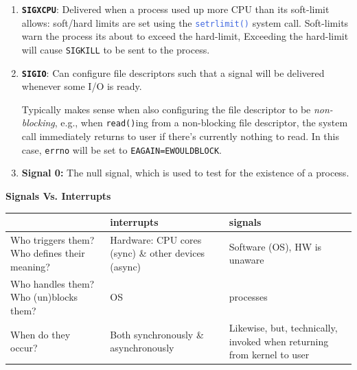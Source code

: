 \documentclass[openany,12pt]{book}
\newcommand{\code}[1]{\texttt{#1}}
\newcommand{\blue}[1]{\textcolor{RoyalBlue}{#1}}
\begin{document}
\begin{enumerate}
  \item \textbf{\code{SIGXCPU}}: Delivered when a process used up more CPU than its soft-limit allows: soft/hard limits are set using the \blue{\code{setrlimit()}} system call. Soft-limits warn the process its about to exceed the hard-limit, Exceeding the hard-limit will cause \code{SIGKILL} to be sent to the process.

  \item \textbf{\code{SIGIO}}: Can configure file descriptors such that a signal will be delivered whenever some I/O is ready.

        Typically makes sense when also configuring the file descriptor to be \textit{non-blocking}, e.g., when \code{read()}ing from a non-blocking file descriptor, the system call immediately returns to user if there's currently nothing to read. In this case, \code{errno} will be set to \code{EAGAIN=EWOULDBLOCK}.


  \item \textbf{Signal 0:} The null signal, which is used to test for the existence of a process.
\end{enumerate}


\begin{samepage}
  \begin{center}
    \textbf{Signals Vs. Interrupts}
    \begin{tabular}{|>{\raggedright\arraybackslash}p{4.5cm}|>{\raggedright\arraybackslash}p{5.5cm}|>{\raggedright\arraybackslash}p{5.5cm}|}
      \hline
      \rowcolor{blue!30}
       & \textbf{interrupts}                                                                      & \textbf{signals} \\
      \hline
      Who triggers them? \newline Who defines their meaning?
       & Hardware: \newline CPU cores (sync) \& other devices (async)
       & Software (OS), \newline HW is unaware                                                                       \\
      \hline
      Who handles them? \newline Who (un)blocks them?
       & OS
       & processes                                                                                                   \\
      \hline
      When do they occur?
       & Both synchronously \& asynchronously
       & Likewise, but, technically, \newline invoked when returning \newline from kernel to user                    \\
      \hline
    \end{tabular}
  \end{center}
\end{samepage}
\end{document}
